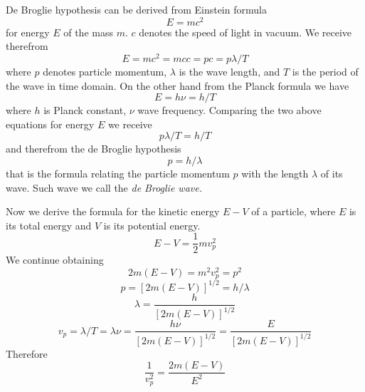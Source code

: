 \documentclass[12pt,a4paper,pl,fleqn]{article}
\begin{document}
De Broglie hypothesis can be derived from Einstein formula
\begin{equation}
E = mc^{2}
\end{equation}
for energy $E$ of the mass $m$\@. $c$ denotes the speed of light in vacuum. We receive therefrom
\begin{equation}
E = mc^{2} = m c c = p c = p \lambda/T
\end{equation}
where $p$ denotes particle momentum, $\lambda$ is the wave length, and $T$ is the period of the wave in time domain.
On the other hand from the Planck formula we have
\begin{equation}
E = h \nu = h/T
\end{equation}
where $h$ is Planck constant, $\nu$ wave frequency.
Comparing the two above equations for energy $E$ we receive
\begin{equation}
p \lambda/T = h/T
\end{equation}
and therefrom the de Broglie hypothesis
\begin{equation}
p = h / \lambda
\end{equation}
that is the formula relating the particle momentum $p$ with the length $\lambda$ of its wave. Such wave we call the {\em de Broglie wave.}

Now we derive the formula for the kinetic energy $E - V$ of a particle, where $E$ is its total energy and $V$ is its potential energy.
\begin{equation}
E - V = \frac{1}{2} m v_{p}^{2}
\end{equation}
We continue obtaining
\begin{equation}
2 m (E - V) = m^{2} v_{p}^{2} = p^{2}
\end{equation}
\begin{equation}
p = [2 m (E - V)]^{1/2} = h/\lambda
\end{equation}
\begin{equation}
\lambda = \frac{h}{[2 m (E - V)]^{1/2}}
\end{equation}
\begin{equation}
v_{p} = \lambda/T = \lambda \nu = \frac{h \nu}{[2 m (E - V)]^{1/2}} = \frac{E}{[2 m (E - V)]^{1/2}}
\end{equation}
Therefore
\begin{equation}
\frac{1}{v_{p}^{2}} = \frac{2 m (E - V)}{E^{2}}
\end{equation}
\end{document}

